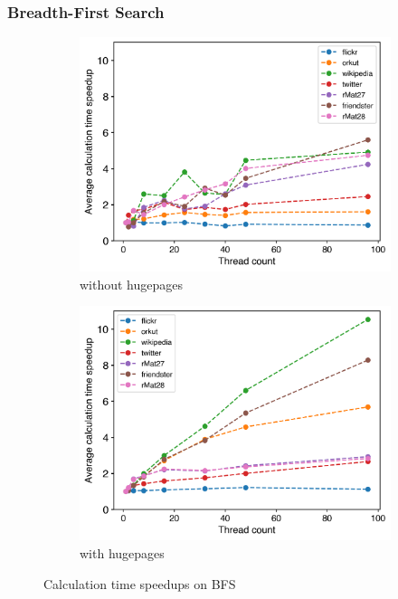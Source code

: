 \subsubsection{Breadth-First Search}
\begin{figure}
	\hfil
	\begin{subfigure}{0.4\textwidth}
		\includegraphics[width=\linewidth]{../../plots/singleNodeBFSGaloisThreads.png}
		\caption{without hugepages}
		\label{fig:galoisSpeedupBFS_noHP}
	\end{subfigure}
	\begin{subfigure}{0.4\textwidth}
		\includegraphics[width=\linewidth]{../../plots/singleNodeBFSGaloisHPThreads.png}
		\caption{with hugepages}
		\label{fig:galoisSpeedupBFS_HP}
	\end{subfigure}
	\hfil
	\caption{Calculation time speedups on BFS}
	\label{fig:galoisSpeedupBFS}
\end{figure}
